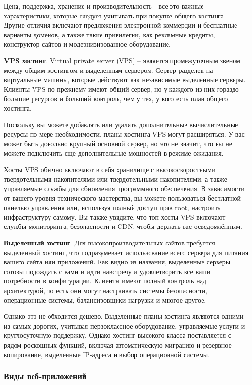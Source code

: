 Цена, поддержка, хранение и производительность - все это важные характеристики, которые следует учитывать при покупке общего хостинга. Другие отличия включают предложения электронной коммерции и бесплатные варианты доменов, а также такие привилегии, как рекламные кредиты, конструктор сайтов и модернизированное оборудование.

\textbf{VPS хостинг}. Virtual private server (VPS) – является промежуточным звеном между общим хостингом и выделенным сервером. Сервер разделен на виртуальные машины, которые действуют как независимые выделенные серверы. Клиенты VPS по-прежнему имеют общий сервер, но у каждого из них гораздо большие ресурсов и больший контроль, чем у тех, у кого есть план общего хостинга. 

Поскольку вы можете добавлять или удалять дополнительные вычислительные ресурсы по мере необходимости, планы хостинга VPS могут расширяться. У вас может быть довольно крупный основной сервер, но это не значит, что вы не можете подключить еще дополнительные мощностей в режиме ожидания.

Хосты VPS обычно включают в себя хранилище с высокоскоростными твердотельными накопителями или твердотельными накопителями, а также управляемые службы для обновления программного обеспечения. В зависимости от вашего уровня технического мастерства, вы можете пользоваться бесплатной панелью управления или, используя полный доступ прав root, настроить инфраструктуру самому. Вы также увидите, что топ-хосты VPS включают службы мониторинга, безопасности и CDN, чтобы держать вас осведомлённым.

\textbf{Выделенный хостинг}.  Для высокопроизводительных сайтов требуется выделенный хостинг, что подразумевает использование всего сервера для питания вашего сайта или приложений. Как видно из названия, выделенные серверы готовы подождать с вами и идти навстречу и удовлетворить все ваши потребности в конфигурации. Клиенты имеют полный контроль над архитектурой, то есть они могут настраивать системы безопасности, операционные системы, балансировщики нагрузки и многое другое. 

Однако это не обходится дешево. Выделенные планы хостинга являются одними из самых дорогих, учитывая первоклассное оборудование, управляемые услуги и круглосуточную поддержку. Однако хостинг высокого класса поставляется с рядом роскошных функций, включая автоматическую миграцию и резервное копирование, выделенные IP-адреса и выбор операционной системы.

\subsubsection{Виды веб-приложений}
\label{typesOfWebApp}

